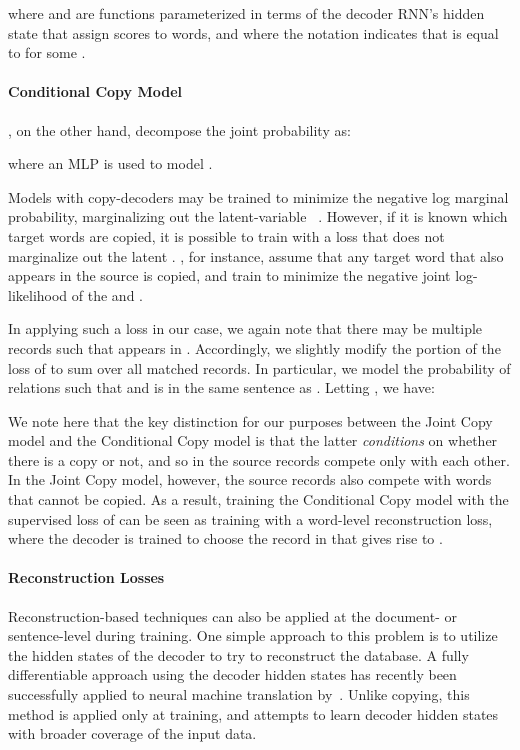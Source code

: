 \documentclass[11pt,letterpaper]{article}
\begin{document}
where  and  are functions parameterized in terms of the decoder RNN's hidden state that assign scores to words, and where the notation  indicates that  is equal to  for some .

\paragraph{Conditional Copy Model} \citet{gulcehre2016pointing}, on the other hand, decompose the joint probability as:


\noindent where an MLP is used to model . 

Models with copy-decoders may be trained to minimize the negative log marginal probability, marginalizing out the latent-variable ~\cite{gu2016incorporating,
yang2016reference,merity2016pointer}. However, if it is known which target words  are copied, it is possible to train with a loss that does not marginalize out the latent . \citet{gulcehre2016pointing}, for instance, assume that any target word  that also appears in the source is copied, and train to minimize the negative joint log-likelihood of the  and . 

In applying such a loss in our case, we again note that there may be multiple records  such that  appears in . Accordingly, we slightly modify the  portion of the loss of \citet{gulcehre2016pointing} to sum over all matched records. In particular, we model the probability of relations  such
that  and  is in the same sentence as . Letting , we have:
 

We note here that the key distinction for our purposes between the Joint Copy model and the Conditional Copy model is that the latter \textit{conditions} on whether there is a copy or not, and so in  the source records compete only with each other. In the Joint Copy model, however, the source records also compete with words that cannot be copied. As a result, training the Conditional Copy model with the supervised loss of \citet{gulcehre2016pointing} can be seen as training with a word-level reconstruction loss, where the decoder is trained to choose the record in  that gives rise to .

\paragraph{Reconstruction Losses}

Reconstruction-based techniques can also be applied at the
document- or sentence-level during training. One simple approach to this problem is to
utilize the hidden states of the decoder to try to reconstruct the
database. A fully differentiable approach using the decoder hidden states has recently been
successfully applied to neural machine translation
by~\citet{tu2017neural}. Unlike copying, this method is applied only
at training, and attempts to learn decoder hidden states with broader 
coverage of the input data.
\end{document}
